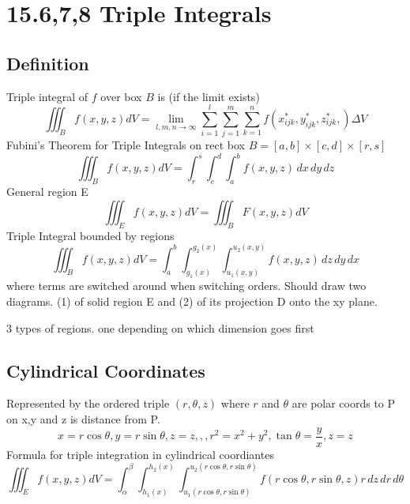 \documentclass[12pt]{book}%
\begin{document}
\section{15.6,7,8 Triple Integrals} 
\subsection{Definition}
Triple integral of $f$  over box $B$  is (if the limit exists)
\begin{equation}
\iiint_B f(x,y,z)dV= \lim_{l,m,n\to \infty} \sum_{i=1}^{l} \sum_{j=1}^{m} \sum_{k=1}^{n} f(x_{ijk}^{*},y_{ijk}^{*},z_{ijk}^{*},)\Delta V
\end{equation}
Fubini's Theorem for Triple Integrals on rect box $B=[a,b]\times[c,d]\times[r,s]$ 
\begin{equation}
    \iiint_B f(x,y,z)dV= \int_{r}^{s} \int_{c}^{d} \int_{a}^{b} f(x,y,z) \,dx\,dy\,dz
\end{equation}
General region E
\begin{equation}
    \iiint_E f(x,y,z)dV= \iiint_B F(x,y,z) dV
\end{equation}
Triple Integral bounded by regions
\begin{equation}
    \iiint_B f(x,y,z)dV= \int_{a}^{b} \int_{g_1(x)}^{g_2(x)} \int_{u_1(x,y)}^{u_2(x,y)} f(x,y,z) \,dz\,dy\,dx
\end{equation}
where terms are switched around when switching orders. Should draw two diagrams. (1) of solid region E and (2) of its projection D onto the xy plane.
\par
3 types of regions. one depending on which dimension goes first
\par
\subsection{Cylindrical Coordinates}
Represented by the ordered triple $(r, \theta ,z)$ where $r$  and $ \theta $  are polar coords to P on x,y and z is distance from P.
\begin{equation}
    x=r \cos \theta ,y=r \sin \theta ,z=z,,,r^2=x^2+y^2, \tan \theta = \frac{y}{x},z=z
\end{equation}
Formula for triple integration in cylindrical coordiantes
\begin{equation}
    \iiint_E f(x,y,z)dV= \int_{\alpha}^{\beta} \int_{h_1(x)}^{h_2(x)} \int_{u_1(r \cos \theta ,r \sin \theta )}^{u_2(r \cos \theta ,r \sin \theta )} f(r \cos \theta ,r \sin \theta ,z) r\,dz\,dr\,d\theta 
\end{equation}
\end{document}
